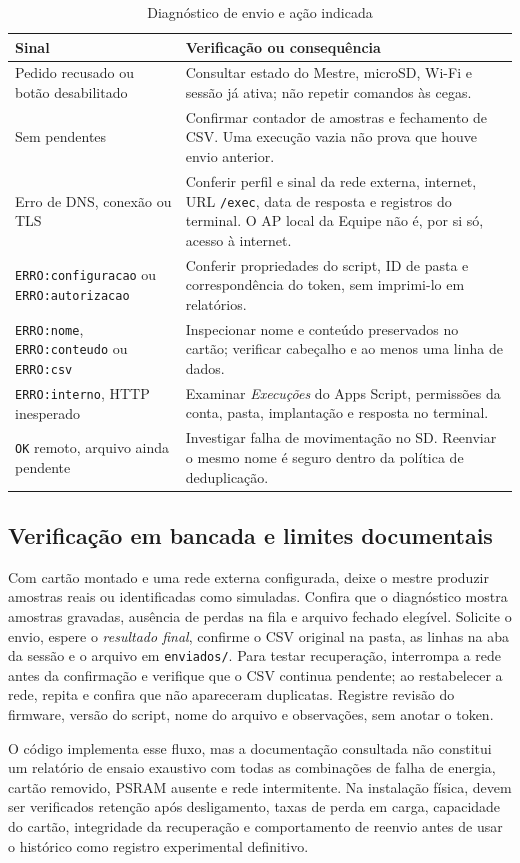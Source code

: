 \begin{table}[htbp]\centering\small
\caption{Diagnóstico de envio e ação indicada}\label{tab:google_falhas}
\begin{tabularx}{\textwidth}{@{}p{4.0cm}X@{}}\toprule
Sinal & Verificação ou consequência\\\midrule
Pedido recusado ou botão desabilitado & Consultar estado do Mestre, microSD, Wi-Fi e sessão já ativa; não repetir comandos às cegas.\\
Sem pendentes & Confirmar contador de amostras e fechamento de CSV. Uma execução vazia não prova que houve envio anterior.\\
Erro de DNS, conexão ou TLS & Conferir perfil e sinal da rede externa, internet, URL \texttt{/exec}, data de resposta e registros do terminal. O AP local da Equipe não é, por si só, acesso à internet.\\
\texttt{ERRO:configuracao} ou \texttt{ERRO:autorizacao} & Conferir propriedades do script, ID de pasta e correspondência do token, sem imprimi-lo em relatórios.\\
\texttt{ERRO:nome}, \texttt{ERRO:conteudo} ou \texttt{ERRO:csv} & Inspecionar nome e conteúdo preservados no cartão; verificar cabeçalho e ao menos uma linha de dados.\\
\texttt{ERRO:interno}, HTTP inesperado & Examinar \emph{Execuções} do Apps Script, permissões da conta, pasta, implantação e resposta no terminal.\\
\texttt{OK} remoto, arquivo ainda pendente & Investigar falha de movimentação no SD. Reenviar o mesmo nome é seguro dentro da política de deduplicação.\\\bottomrule
\end{tabularx}
\end{table}

\subsection{Verificação em bancada e limites documentais}
Com cartão montado e uma rede externa configurada, deixe o mestre produzir amostras reais ou identificadas como simuladas. Confira que o diagnóstico mostra amostras gravadas, ausência de perdas na fila e arquivo fechado elegível. Solicite o envio, espere o \emph{resultado final}, confirme o CSV original na pasta, as linhas na aba da sessão e o arquivo em \texttt{enviados/}. Para testar recuperação, interrompa a rede antes da confirmação e verifique que o CSV continua pendente; ao restabelecer a rede, repita e confira que não apareceram duplicatas. Registre revisão do firmware, versão do script, nome do arquivo e observações, sem anotar o token.

O código implementa esse fluxo, mas a documentação consultada não constitui um relatório de ensaio exaustivo com todas as combinações de falha de energia, cartão removido, PSRAM ausente e rede intermitente. Na instalação física, devem ser verificados retenção após desligamento, taxas de perda em carga, capacidade do cartão, integridade da recuperação e comportamento de reenvio antes de usar o histórico como registro experimental definitivo.
